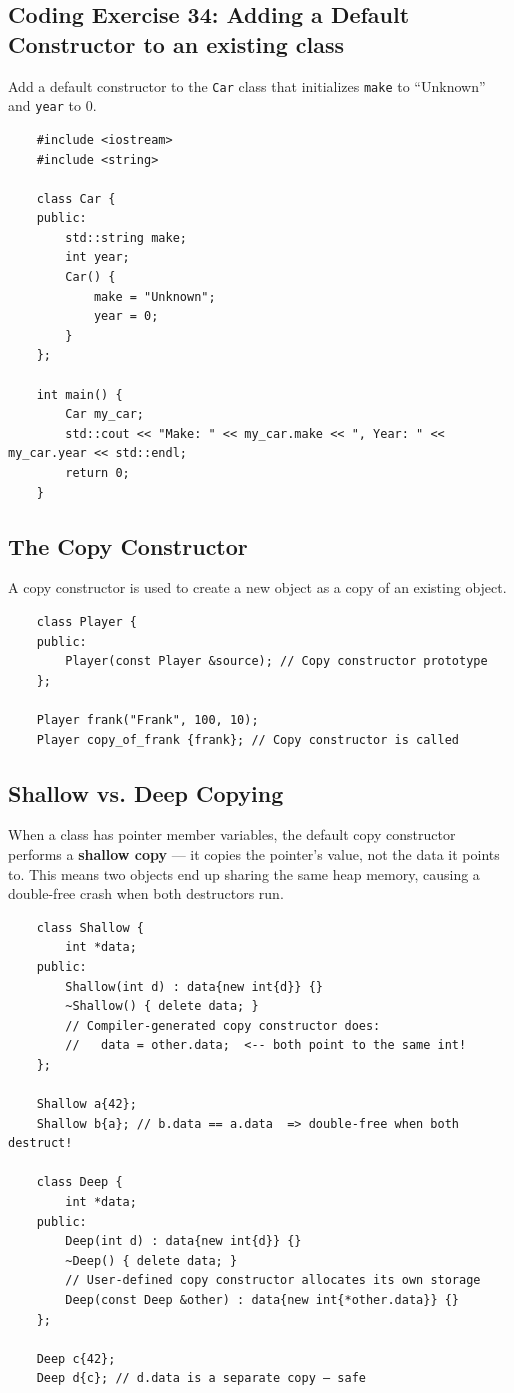 \subsection{Coding Exercise 34: Adding a Default Constructor to an existing class}
Add a default constructor to the \texttt{Car} class that initializes \texttt{make} to ``Unknown'' and \texttt{year} to 0.
\begin{lstlisting}
	#include <iostream>
	#include <string>

	class Car {
	public:
		std::string make;
		int year;
		Car() {
			make = "Unknown";
			year = 0;
		}
	};

	int main() {
		Car my_car;
		std::cout << "Make: " << my_car.make << ", Year: " << my_car.year << std::endl;
		return 0;
	}
\end{lstlisting}

\subsection{The Copy Constructor}
A copy constructor is used to create a new object as a copy of an existing object.
\begin{lstlisting}
	class Player {
	public:
		Player(const Player &source); // Copy constructor prototype
	};

	Player frank("Frank", 100, 10);
	Player copy_of_frank {frank}; // Copy constructor is called
\end{lstlisting}

\subsection{Shallow vs. Deep Copying}
When a class has pointer member variables, the default copy constructor performs a \textbf{shallow copy} — it copies the pointer's value, not the data it points to. This means two objects end up sharing the same heap memory, causing a double-free crash when both destructors run.

\begin{example}{\leavevmode}
\begin{lstlisting}
	class Shallow {
		int *data;
	public:
		Shallow(int d) : data{new int{d}} {}
		~Shallow() { delete data; }
		// Compiler-generated copy constructor does:
		//   data = other.data;  <-- both point to the same int!
	};

	Shallow a{42};
	Shallow b{a}; // b.data == a.data  => double-free when both destruct!

	class Deep {
		int *data;
	public:
		Deep(int d) : data{new int{d}} {}
		~Deep() { delete data; }
		// User-defined copy constructor allocates its own storage
		Deep(const Deep &other) : data{new int{*other.data}} {}
	};

	Deep c{42};
	Deep d{c}; // d.data is a separate copy — safe
\end{lstlisting}
\end{example}


